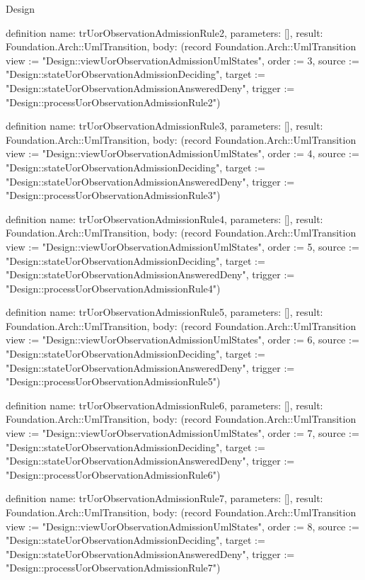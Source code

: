 \begin{lexlean}{Design}
\begin{semanticmodule}
definition{
  name: trUorObservationAdmissionRule2,
  parameters: [],
  result: Foundation.Arch::UmlTransition,
  body: (record Foundation.Arch::UmlTransition {view := "Design::viewUorObservationAdmissionUmlStates", order := 3, source := "Design::stateUorObservationAdmissionDeciding", target := "Design::stateUorObservationAdmissionAnsweredDeny", trigger := "Design::processUorObservationAdmissionRule2"})
}

definition{
  name: trUorObservationAdmissionRule3,
  parameters: [],
  result: Foundation.Arch::UmlTransition,
  body: (record Foundation.Arch::UmlTransition {view := "Design::viewUorObservationAdmissionUmlStates", order := 4, source := "Design::stateUorObservationAdmissionDeciding", target := "Design::stateUorObservationAdmissionAnsweredDeny", trigger := "Design::processUorObservationAdmissionRule3"})
}

definition{
  name: trUorObservationAdmissionRule4,
  parameters: [],
  result: Foundation.Arch::UmlTransition,
  body: (record Foundation.Arch::UmlTransition {view := "Design::viewUorObservationAdmissionUmlStates", order := 5, source := "Design::stateUorObservationAdmissionDeciding", target := "Design::stateUorObservationAdmissionAnsweredDeny", trigger := "Design::processUorObservationAdmissionRule4"})
}

definition{
  name: trUorObservationAdmissionRule5,
  parameters: [],
  result: Foundation.Arch::UmlTransition,
  body: (record Foundation.Arch::UmlTransition {view := "Design::viewUorObservationAdmissionUmlStates", order := 6, source := "Design::stateUorObservationAdmissionDeciding", target := "Design::stateUorObservationAdmissionAnsweredDeny", trigger := "Design::processUorObservationAdmissionRule5"})
}

definition{
  name: trUorObservationAdmissionRule6,
  parameters: [],
  result: Foundation.Arch::UmlTransition,
  body: (record Foundation.Arch::UmlTransition {view := "Design::viewUorObservationAdmissionUmlStates", order := 7, source := "Design::stateUorObservationAdmissionDeciding", target := "Design::stateUorObservationAdmissionAnsweredDeny", trigger := "Design::processUorObservationAdmissionRule6"})
}

definition{
  name: trUorObservationAdmissionRule7,
  parameters: [],
  result: Foundation.Arch::UmlTransition,
  body: (record Foundation.Arch::UmlTransition {view := "Design::viewUorObservationAdmissionUmlStates", order := 8, source := "Design::stateUorObservationAdmissionDeciding", target := "Design::stateUorObservationAdmissionAnsweredDeny", trigger := "Design::processUorObservationAdmissionRule7"})
}


\end{semanticmodule}
\end{lexlean}

